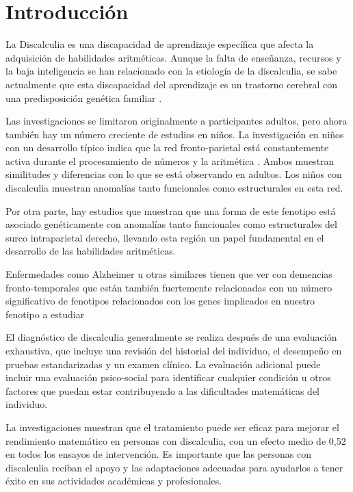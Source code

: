 \section{Introducción}

La Discalculia es una discapacidad de aprendizaje específica que afecta la adquisición de habilidades aritméticas. Aunque la falta de  enseñanza, recursos y la baja inteligencia se han relacionado con la etiología de la discalculia, se sabe actualmente que esta discapacidad del aprendizaje es un trastorno cerebral con una predisposición genética familiar \cite{Molko2003}.

\hfill

Las investigaciones se limitaron originalmente a participantes adultos, pero ahora también hay un número creciente de estudios en niños. La investigación en niños con un desarrollo típico indica que la red fronto-parietal está constantemente activa durante el procesamiento de números y la aritmética \cite{originDis}. Ambos muestran similitudes y diferencias con lo que se está observando en adultos. Los niños con discalculia muestran anomalías tanto funcionales como estructurales en esta red.

\hfill


Por otra parte, hay estudios \cite{Molko2003,Shalev2001} que muestran que una forma de este fenotipo está asociado genéticamente con anomalías tanto funcionales como estructurales del surco intraparietal derecho, llevando esta región un papel fundamental en el desarrollo de las habilidades aritméticas.

\hfill

Enfermedades como Alzheimer u otras similares tienen que ver con demencias fronto-temporales \cite{Walterfang2014} que están también fuertemente relacionadas con un número significativo de fenotipos relacionados con los genes implicados en nuestro fenotipo a estudiar

\hfill

El diagnóstico de discalculia generalmente \cite{TreatmentDis} se realiza después de una evaluación exhaustiva, que incluye una revisión del historial del individuo, el desempeño en pruebas estandarizadas y un examen clínico. La evaluación adicional puede incluir una evaluación psico-social para identificar cualquier condición u otros factores que puedan estar contribuyendo a las dificultades matemáticas del individuo.

\hfill

La investigaciones muestran que el tratamiento puede ser eficaz para mejorar el rendimiento matemático en personas con discalculia, con un efecto medio de 0,52 \cite{TreatmentDis} en todos los ensayos de intervención. Es importante que las personas con discalculia reciban el apoyo y las adaptaciones adecuadas para ayudarlos a tener éxito en sus actividades académicas y profesionales.

